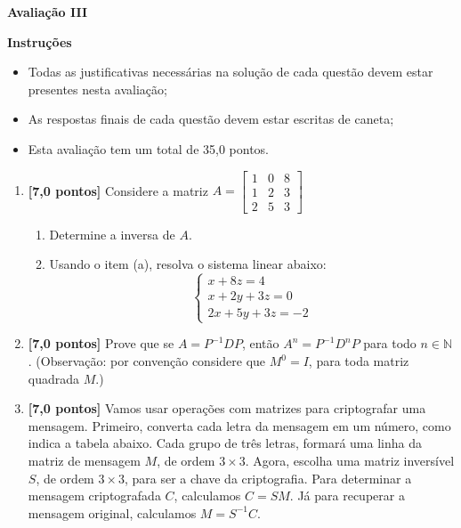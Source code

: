 \documentclass[12pt,a4paper]{article}
\begin{document}
\begin{center}
 \textbf{Avaliação III}
\end{center}

\textbf{Instruções}
\begin{itemize}
 \item Todas as justificativas necessárias na solução de cada questão devem estar presentes nesta avaliação;
 \item As respostas finais de cada questão devem estar escritas de caneta;
 \item Esta avaliação tem um total de 35,0 pontos.
\end{itemize}

\begin{enumerate}
  \item \textbf{[7,0 pontos]} Considere a matriz
    $A=
      \begin{bmatrix}
        1 & 0 & 8 \\
        1 & 2 & 3 \\
        2 & 5 & 3
      \end{bmatrix}$

    \begin{enumerate}
      \item Determine a inversa de $A$.
      \item Usando o item (a), resolva o sistema linear abaixo:
      $$\begin{cases}
        x +  8 z  =  4\\
        x  +  2y  +  3z  =  0\\
        2x  +  5y  +  3z  =  -2
      \end{cases}$$
    \end{enumerate}

  \item \textbf{[7,0 pontos]} Prove que se $A = P^{-1}DP$, então $A^n = P^{-1}D^nP$ para todo $n\in\mathbb{N}$.
    (Observação: por convenção considere que $M^0=I$, para toda matriz quadrada $M$.)
  
  \item \textbf{[7,0 pontos]} Vamos usar operações com matrizes para criptografar uma mensagem.
    Primeiro, converta cada letra da mensagem em um número, como indica
    a tabela abaixo. Cada grupo de três letras, formará uma linha da matriz
    de mensagem $M$, de ordem $3\times3$. Agora, escolha uma matriz
    inversível $S$, de ordem $3\times3$, para ser a chave da criptografia.
    Para determinar a mensagem criptografada $C$, calculamos $C=SM$.
    Já para recuperar a mensagem original, calculamos $M=S^{-1}C$.


\end{enumerate}
\end{document}
